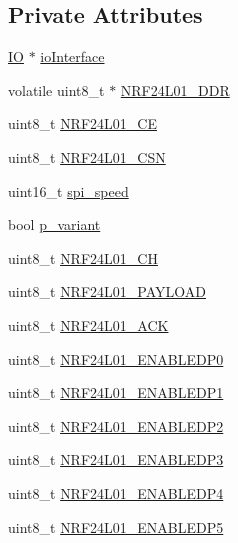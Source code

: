 \subsection*{Private Attributes}
\begin{DoxyCompactItemize}
\item 
\hyperlink{classIO}{IO} $\ast$ \hyperlink{classNRF24L01_ae1eea9f32346ecf60ffbf5224d338359}{io\+Interface}
\item 
volatile uint8\+\_\+t $\ast$ \hyperlink{classNRF24L01_a42ef1a6d858a115327d0a7310aaba57c}{N\+R\+F24\+L01\+\_\+\+D\+DR}
\item 
uint8\+\_\+t \hyperlink{classNRF24L01_a56a20345fcb667fcfc9bc1cb62d5152f}{N\+R\+F24\+L01\+\_\+\+CE}
\item 
uint8\+\_\+t \hyperlink{classNRF24L01_a4d36b61597b9919dd4a0ecdc53526020}{N\+R\+F24\+L01\+\_\+\+C\+SN}
\item 
uint16\+\_\+t \hyperlink{classNRF24L01_a4701641c1e8b3d082deb03f93c84d8c7}{spi\+\_\+speed}
\item 
bool \hyperlink{classNRF24L01_a082a99d802a3f2335da94e67cf8440ea}{p\+\_\+variant}
\item 
uint8\+\_\+t \hyperlink{classNRF24L01_a2f5e84525760899949446db94d225700}{N\+R\+F24\+L01\+\_\+\+CH}
\item 
uint8\+\_\+t \hyperlink{classNRF24L01_a6f035e7c49d8ed5e1ab84242cef0e9be}{N\+R\+F24\+L01\+\_\+\+P\+A\+Y\+L\+O\+AD}
\item 
uint8\+\_\+t \hyperlink{classNRF24L01_af2e0a88f330c86d0cc6c43180f70ecbd}{N\+R\+F24\+L01\+\_\+\+A\+CK}
\item 
uint8\+\_\+t \hyperlink{classNRF24L01_a10c710f3795c47ebde120ca3d975c891}{N\+R\+F24\+L01\+\_\+\+E\+N\+A\+B\+L\+E\+D\+P0}
\item 
uint8\+\_\+t \hyperlink{classNRF24L01_a8ebd82a57efbaa5928a56ba6780740de}{N\+R\+F24\+L01\+\_\+\+E\+N\+A\+B\+L\+E\+D\+P1}
\item 
uint8\+\_\+t \hyperlink{classNRF24L01_aac40f597790cf3a62b382f919f1293ce}{N\+R\+F24\+L01\+\_\+\+E\+N\+A\+B\+L\+E\+D\+P2}
\item 
uint8\+\_\+t \hyperlink{classNRF24L01_aea0d090c7d6da9b137ce4ce3690535e8}{N\+R\+F24\+L01\+\_\+\+E\+N\+A\+B\+L\+E\+D\+P3}
\item 
uint8\+\_\+t \hyperlink{classNRF24L01_a4f19e32ed3324724d3478b9f841a2790}{N\+R\+F24\+L01\+\_\+\+E\+N\+A\+B\+L\+E\+D\+P4}
\item 
uint8\+\_\+t \hyperlink{classNRF24L01_ae77cf1829f80c703e36ef57b6d23e9a9}{N\+R\+F24\+L01\+\_\+\+E\+N\+A\+B\+L\+E\+D\+P5}
\item 

\end{DoxyCompactItemize}
